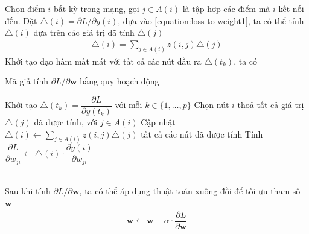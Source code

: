 Chọn điểm $i$ bất kỳ trong mạng, gọi $j\in A(i)$ là tập hợp các điểm mà $i$ kết nối đến. Đặt $\triangle(i)=\partial L/\partial y(i)$, dựa vào \ref{equation:loss-to-weight1}, ta có thể tính $\triangle(i)$ dựa trên các giá trị đã tính $\triangle(j)$
\begin{align}
    \triangle(i)=\sum_{j\in A(i)}z(i,j)\triangle(j)
\end{align}
Khởi tạo đạo hàm mất mát với tất cả các nút đầu ra $\triangle(t_k)$, ta có
\begin{algorithmz}
    \caption{Mã giả tính $\partial L/\partial\mathbf{w}$ bằng quy hoạch động \cite{Aggarwal2023}}
    \label{algorithm:dynamic-programming-loss-to-weight}
    \begin{algorithmic}[1]
        \State Khởi tạo $\triangle(t_k)=\dfrac{\partial L}{\partial y(t_k)}$ với mỗi $k\in\{1,\dots,p\}$
        \Repeat
        \State Chọn nút $i$ thoả tất cả giá trị $\triangle(j)$ đã được tính, với $j\in A(i)$
        \State Cập nhật $\triangle(i)\gets\sum_{j\in A(i)}z(i,j)\triangle(j)$
        \Until tất cả các nút đã được tính
        \State Tính $\dfrac{\partial L}{\partial w_{ji}}\gets\triangle(i)\cdot\dfrac{\partial y(i)}{\partial w_{ji}}$
        \EndFor
    \end{algorithmic}
\end{algorithmz}\\
Sau khi tính $\partial L/\partial\mathbf{w}$, ta có thể áp dụng thuật toán xuống đồi để tối ưu tham số $\mathbf{w}$
\begin{align}
    \mathbf{w}\leftarrow\mathbf{w}-\alpha\cdot\dfrac{\partial L}{\partial\mathbf{w}}
\end{align}

